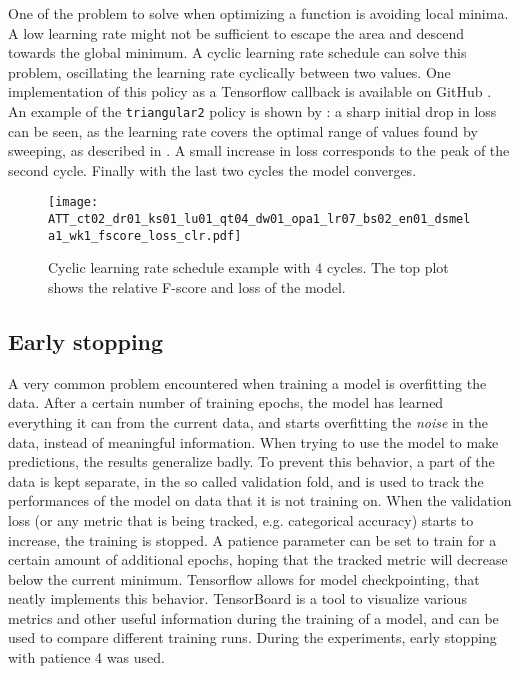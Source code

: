 One of the problem to solve when optimizing a function is avoiding local minima.
A low learning rate might not be sufficient to escape the area and descend
towards the global minimum.
A cyclic learning rate schedule \cite{smith2017cyclical} can solve this problem,
oscillating the learning rate cyclically between two values.
One implementation of this policy as a Tensorflow callback is available on
GitHub \cite{bckenstlerCLR}.
An example of the \texttt{triangular2} policy is shown by
: a sharp initial drop in loss can be seen, as the
learning rate covers the optimal range of values found by sweeping, as
described in . A small increase in loss corresponds to the
peak of the second cycle. Finally with the last two cycles the model converges.

\begin{figure}[t!]
    \centering
    \texttt{[image: ATT\_ct02\_dr01\_ks01\_lu01\_qt04\_dw01\_opa1\_lr07\_bs02\_en01\_dsmela1\_wk1\_fscore\_loss\_clr.pdf]}
    \caption{Cyclic learning rate schedule example with $4$ cycles.
    The top plot shows the relative F-score and loss of the model.}%
    \label{fig:cyclic_lr_example}
\end{figure}


\subsection{Early stopping}

A very common problem encountered when training a model is overfitting the
data. After a certain number of training epochs, the model has learned
everything it can from the current data, and starts overfitting the
\textit{noise} in the data, instead of meaningful information.
When trying to use the model to make predictions, the results generalize badly.
To prevent this behavior, a part of the data is kept separate, in the so
called validation fold, and is used to track the performances of the model on
data that it is not training on.
When the validation loss (or any metric that is being tracked, e.g. categorical
accuracy) starts to increase, the training is stopped.
A patience parameter can be set to train for a certain amount of additional
epochs, hoping that the tracked metric will decrease below the current minimum.
Tensorflow allows for model checkpointing, that neatly implements this
behavior.
TensorBoard is a tool to visualize various metrics and other useful information
during the training of a model, and can be used to compare different training
runs.
During the experiments, early stopping with patience 4 was used.

